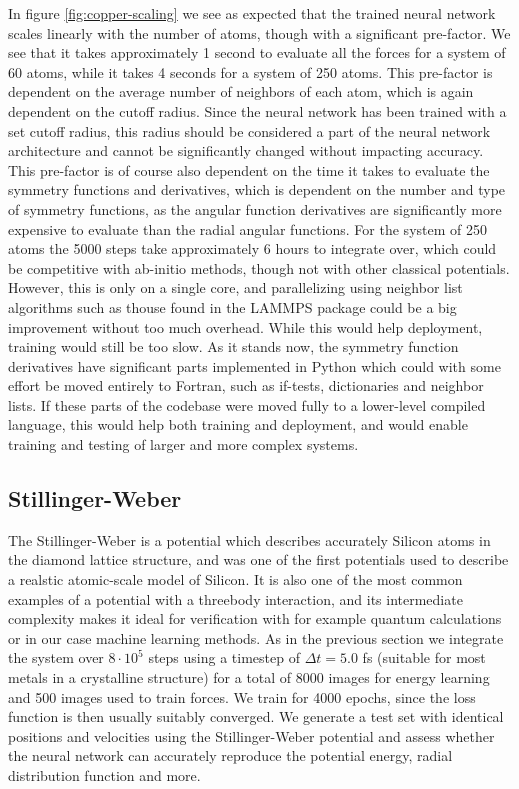 In figure \ref{fig:copper-scaling} we see as expected that the trained neural network
scales linearly with the number of atoms, though with a significant pre-factor.
We see that it takes approximately 1 second to evaluate all the forces
for a system of 60 atoms, while it takes 4 seconds for a system of 250 atoms.
This pre-factor is dependent on the average number of neighbors
of each atom, which is again dependent on the cutoff radius.
Since the neural network has been trained with a set cutoff radius,
this radius should be considered a part of the neural network architecture
and cannot be significantly changed without impacting accuracy.
This pre-factor is of course also dependent on the time it takes to evaluate
the symmetry functions and derivatives, which is dependent on the number
and type of symmetry functions, as the angular function derivatives are significantly
more expensive to evaluate than the radial angular functions.
For the system of 250 atoms the 5000 steps take approximately 6 hours
to integrate over, which could be competitive with ab-initio methods,
though not with other classical potentials.
However, this is only on a single core, and parallelizing using neighbor list algorithms
such as thouse found in the LAMMPS package could be a big improvement without too much overhead.
While this would help deployment, training would still be too slow.
As it stands now, the symmetry function derivatives have significant parts
implemented in Python which could with some effort be moved entirely to Fortran,
such as if-tests, dictionaries and neighbor lists.
If these parts of the codebase were moved fully to a lower-level compiled
language, this would help both training and deployment, and would enable
training and testing of larger and more complex systems.

\subsection{Stillinger-Weber}
The Stillinger-Weber is a potential which describes accurately
Silicon atoms in the diamond lattice structure, and was
one of the first potentials used to describe a realstic atomic-scale
model of Silicon. It is also one of the most common examples
of a potential with a threebody interaction, and its intermediate complexity
makes it ideal for verification with for example quantum calculations
or in our case machine learning methods.
As in the previous section we integrate the system over $8 \cdot 10^5$
steps using a timestep of $\Delta t = 5.0$ fs (suitable for most metals
in a crystalline structure) for a total of 8000 images for energy learning
and 500 images used to train forces. We train for 4000 epochs, since
the loss function is then usually suitably converged.
We generate a test set with identical positions and velocities
using the Stillinger-Weber potential and assess whether the neural network
can accurately reproduce the potential energy, radial distribution function
and more.

